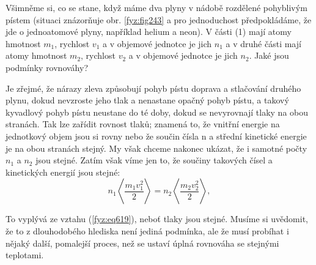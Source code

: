     Všimněme si, co se stane, když máme dva plyny v nádobě rozdělené pohyblivým pístem (situaci
    znázorňuje obr. \ref{fyz:fig243} a pro jednoduchost předpokládáme, že jde o jednoatomové plyny,
    například helium a neon). V části (1) mají atomy hmotnost \(m_1\), rychlost \(v_1\) a v objemové
    jednotce je jich \(n_1\) a v druhé části mají atomy hmotnost \(m_2\), rychlost \(v_2\) a v
    objemové jednotce je jich \(n_2\). Jaké jsou podmínky rovnováhy?
    
    Je zřejmé, že nárazy zleva způsobují pohyb pístu doprava a stlačování druhého plynu, dokud
    nevzroste jeho tlak a nenastane opačný pohyb pístu, a takový kyvadlový pohyb pístu neustane do
    té doby, dokud se nevyrovnají tlaky na obou stranách. Tak lze zařídit rovnost tlaků; znamená to,
    že vnitřní energie na jednotkový objem jsou si rovny nebo že součin čísla n a střední kinetické
    energie je na obou stranách stejný. My však chceme nakonec ukázat, že i samotné počty \(n_1\) a
    \(n_2\) jsou stejné. Zatím však víme jen to, že součiny takových čísel a kinetických energií
    jsou stejné:    
    \begin{equation*}
      n_1\left\langle\frac{m_1v^2_1}{2}\right\rangle=n_2\left\langle\frac{m_2v^2_2}{2}\right\rangle,
    \end{equation*}
    
    To vyplývá ze vztahu (\ref{fyz:eq619}), neboť tlaky jsou stejné. Musíme si uvědomit, že to z
    dlouhodobého hlediska není jediná podmínka, ale že musí probíhat i nějaký další, pomalejší
    proces, než se ustaví úplná rovnováha se stejnými teplotami.
    
